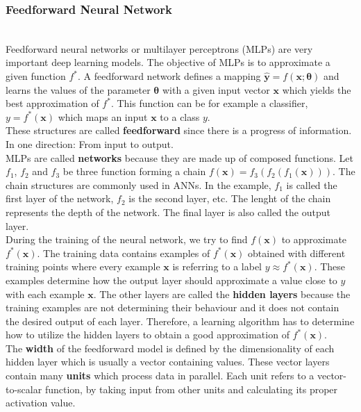 
\subsubsection{Feedforward Neural Network}~\\

Feedforward neural networks or multilayer perceptrons (MLPs) are very important
deep learning models. The objective of MLPs is to approximate a given function
$f^{*}$. A feedforward network defines a mapping $\bm{\hat{y}} = f(\bm{x};
\bm{\theta})$ and learns the values of the parameter $\bm{\theta}$ with a given
input vector $\bm{x}$ which yields the best approximation of $f^{*}$. This
function can be for example a classifier, $y = f^{*}(\bm{x})$ which maps an
input $\bm{x}$ to a class $y$.\\

These structures are called \textbf{feedforward} since there is a progress of
information. In one direction: From input to output.\\

MLPs are called \textbf{networks} because they are made up of composed
functions. Let $f_{1}$, $f_{2}$ and $f_{3}$ be three function forming a chain
$f(\bm{x}) = f_{3}(f_{2}(f_{1}(\bm{x})))$. The chain structures are commonly
used in ANNs. In the example, $f_{1}$ is called the first layer of the network,
$f_{2}$ is the second layer, etc. The lenght of the chain represents the depth
of the network. The final layer is also called the output layer.\\

During the training of the neural network, we try to find $f(\bm{x})$ to
approximate $f^{*}(\bm{x})$. The training data contains examples of
$f^{*}(\bm{x})$ obtained with different training points where every example
$\bm{x}$ is referring to a label $y \approx f^{*}(\bm{x})$. These examples
determine how the output layer should approximate a value close to $y$ with each
example $\bm{x}$. The other layers are called the \textbf{hidden layers} because
the training examples are not determining their behaviour and it does not
contain the desired output of each layer. Therefore, a learning algorithm has to
determine how to utilize the hidden layers to obtain a good approximation of
$f^{*}(\bm{x})$.\\

The \textbf{width} of the feedforward model is defined by the dimensionality of
each hidden layer which is usually a vector containing values. These vector
layers contain many \textbf{units} which process data in parallel. Each unit
refers to a vector-to-scalar function, by taking input from other units and
calculating its proper activation value.\\

